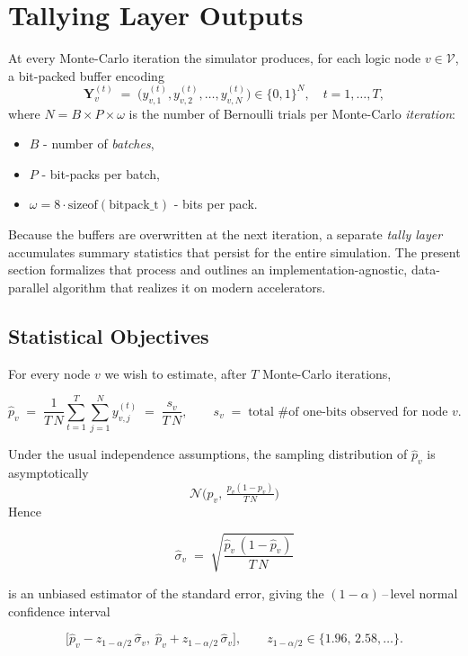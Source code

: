 \chapter{Tallying Layer Outputs}
\label{sec:tally_kernel}

At every Monte-Carlo iteration the simulator produces, for each logic node
\(v\in \mathcal{V}\), a bit-packed buffer encoding
\[
  \mathbf{Y}_v^{(t)}
  \;=\;
  \bigl(y_{v,1}^{(t)}, y_{v,2}^{(t)},\dots, y_{v,N}^{(t)}\bigr)
  \in\{0,1\}^N,
  \quad t = 1,\dots,T,
\]
where \(N\!=\!B\!\times\!P\!\times\!\omega\) is the number of Bernoulli trials
per Monte-Carlo \emph{iteration}:
\begin{itemize}
    \item \(B\) - number of \emph{batches},
    \item \(P\) - bit-packs per batch,
    \item \(\omega\!=\!8\cdot\mathrm{sizeof}(\text{bitpack\_t})\) - bits per pack.
\end{itemize}
Because the buffers are overwritten at the next iteration, a
separate \emph{tally layer} accumulates summary statistics that persist for the
entire simulation.  The present section formalizes that process and outlines
an implementation-agnostic, data-parallel algorithm that realizes it on modern
accelerators.

\section{Statistical Objectives}
\label{subsec:tally_objective}

For every node \(v\) we wish to estimate, after \(T\) Monte-Carlo iterations,

\[
  \widehat{p}_v
  \;=\;
  \frac{1}{T\,N}
  \sum_{t=1}^{T}\sum_{j=1}^{N} y_{v,j}^{(t)}
  \;=\;
  \frac{s_v}{T\,N},
  \qquad
  s_v \;=\; \text{total \# of one-bits observed for node \(v\)}.
\]

Under the usual independence assumptions, the sampling distribution of
\(\widehat{p}_v\) is asymptotically
\[
\mathcal{N}\!\bigl(p_v,\,
  \tfrac{p_v(1-p_v)}{T\,N}\bigr)
\]
Hence

\[
  \widehat{\sigma}_v
  \;=\;
  \sqrt{\frac{\widehat{p}_v\,(1-\widehat{p}_v)}{T\,N}}
\]

is an unbiased estimator of the standard error, giving the
\((1-\alpha)\)\,--\,level normal confidence interval

\[
  \bigl[
    \widehat{p}_v - z_{1-\alpha/2}\,\widehat{\sigma}_v,\;
    \widehat{p}_v + z_{1-\alpha/2}\,\widehat{\sigma}_v
  \bigr],
  \qquad
  z_{1-\alpha/2}\in\{1.96,\,2.58,\dots\}.
\]

